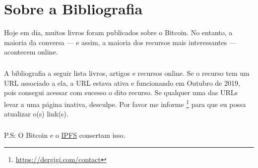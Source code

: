 \chapter*{Sobre a Bibliografia}

Hoje em dia, muitos livros foram publicados sobre o Bitcoin. No entanto, a maioria da conversa --- e assim, a maioria dos recursos mais interessantes --- acontecem online.

\paragraph{}
A bibliografia a seguir lista livros, artigos e recursos online. 
Se o recurso tem um URL associado a ela, a URL estava ativa e funcionando em Outubro de 2019, 
pois consegui acessar com sucesso o dito recurso. Se qualquer uma das URLs levar a uma página inativa, 
desculpe. Por favor me informe \footnote{\url{https://dergigi.com/contact}} para que eu possa atualizar o(s) link(s).

\paragraph{}
P.S: O Bitcoin e o \href{https://ipfs.io/}{IPFS} consertam isso.

